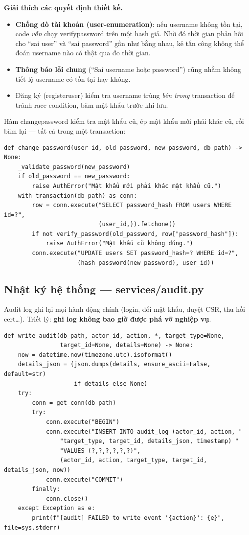 \documentclass[12pt,a4paper]{article}
\newcommand{\code}[1]{{\ttfamily\small\def\_{\textunderscore\discretionary{}{}{}}#1}}
\begin{document}
\textbf{Giải thích các quyết định thiết kế.}
\begin{itemize}
  \item \textbf{Chống dò tài khoản (user-enumeration)}: nếu username không tồn
        tại, code \emph{vẫn} chạy \code{verify\_password} trên một hash giả. Nhờ
        đó thời gian phản hồi cho ``sai user'' và ``sai password'' gần như bằng
        nhau, kẻ tấn công không thể đoán username nào có thật qua đo thời gian.
  \item \textbf{Thông báo lỗi chung} (``Sai username hoặc password'') cũng nhằm
        không tiết lộ username có tồn tại hay không.
  \item Đăng ký (\code{register\_user}) kiểm tra username trùng \emph{bên trong}
        transaction để tránh race condition, băm mật khẩu trước khi lưu.
\end{itemize}

Hàm \code{change\_password} kiểm tra mật khẩu cũ, ép mật khẩu mới phải khác cũ,
rồi băm lại — tất cả trong một transaction:

\begin{Verbatim}
def change_password(user_id, old_password, new_password, db_path) -> None:
    _validate_password(new_password)
    if old_password == new_password:
        raise AuthError("Mật khẩu mới phải khác mật khẩu cũ.")
    with transaction(db_path) as conn:
        row = conn.execute("SELECT password_hash FROM users WHERE id=?",
                           (user_id,)).fetchone()
        if not verify_password(old_password, row["password_hash"]):
            raise AuthError("Mật khẩu cũ không đúng.")
        conn.execute("UPDATE users SET password_hash=? WHERE id=?",
                     (hash_password(new_password), user_id))
\end{Verbatim}

\subsection{Nhật ký hệ thống — \code{services/audit.py}}

Audit log ghi lại mọi hành động chính (login, đổi mật khẩu, duyệt CSR, thu hồi
cert\dots). Triết lý: \textbf{ghi log không bao giờ được phá vỡ nghiệp vụ}.

\begin{Verbatim}
def write_audit(db_path, actor_id, action, *, target_type=None,
                target_id=None, details=None) -> None:
    now = datetime.now(timezone.utc).isoformat()
    details_json = (json.dumps(details, ensure_ascii=False, default=str)
                    if details else None)
    try:
        conn = get_conn(db_path)
        try:
            conn.execute("BEGIN")
            conn.execute("INSERT INTO audit_log (actor_id, action, "
                "target_type, target_id, details_json, timestamp) "
                "VALUES (?,?,?,?,?,?)",
                (actor_id, action, target_type, target_id, details_json, now))
            conn.execute("COMMIT")
        finally:
            conn.close()
    except Exception as e:
        print(f"[audit] FAILED to write event '{action}': {e}", file=sys.stderr)
\end{Verbatim}
\end{document}
